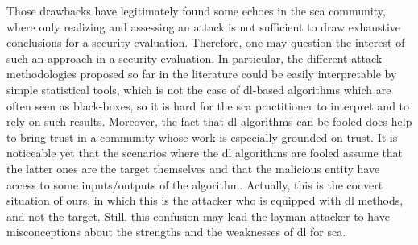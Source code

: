 Those drawbacks have legitimately found some echoes in the \gls{sca} community, where only realizing and assessing an attack is not sufficient to draw exhaustive conclusions for a security evaluation.
Therefore, one may question the interest of such an approach in a security evaluation.
In particular, the different attack methodologies proposed so far in the literature could be easily interpretable by simple statistical tools, which is not the case of \gls{dl}-based algorithms which are often seen as black-boxes, so it is hard for the \gls{sca} practitioner to interpret and to rely on such results.
Moreover, the fact that \gls{dl} algorithms can be fooled does help to bring trust in a community whose work is especially grounded on trust.
It is noticeable yet that the scenarios where the \gls{dl} algorithms are fooled assume that the latter ones are the target themselves and that the malicious entity have access to some inputs/outputs of the algorithm.
Actually, this is the convert situation of ours, in which this is the attacker who is equipped with \gls{dl} methods, and not the target.
Still, this confusion may lead the layman attacker to have misconceptions about the strengths and the weaknesses of \gls{dl} for \gls{sca}.

\addtocounter{footnote}{-2} %
\addtocounter{footnote}{1} %
\addtocounter{footnote}{1} %

